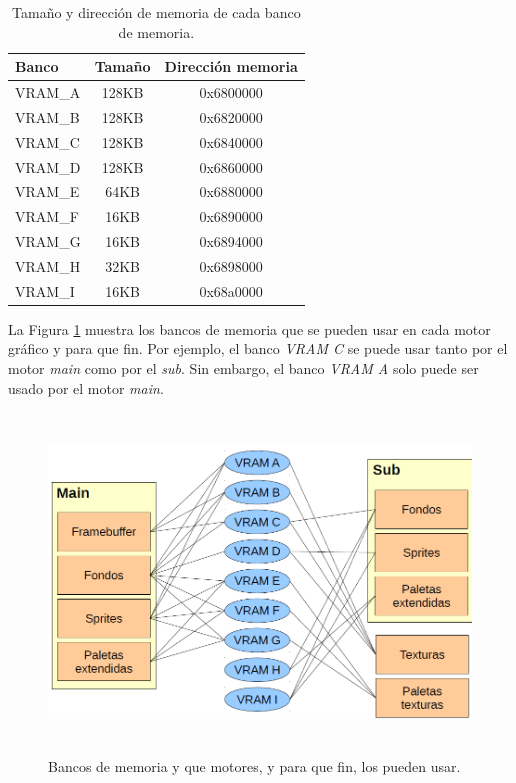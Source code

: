 \begin{table}[t]
\centering
\caption{Tamaño y dirección de memoria de cada banco de memoria.}
\begin{tabular}{|l |c | c|}
\hline
Banco & Tamaño &  Dirección memoria  \\
\hline
\hline
VRAM\_A & 128KB & 0x6800000 \\
\hline
VRAM\_B & 128KB  &	0x6820000 \\
\hline
VRAM\_C & 128KB  &	0x6840000 \\
\hline
VRAM\_D	& 128KB  &	0x6860000 \\
\hline
VRAM\_E	& 64KB  &	0x6880000\\
\hline
VRAM\_F	& 16KB  &	0x6890000 \\
\hline
VRAM\_G	& 16KB  &	0x6894000\\
\hline
VRAM\_H	& 32KB & 	0x6898000 \\
\hline
VRAM\_I	& 16KB  &	0x68a0000\\
\hline
\end{tabular}
\label{tab_c5_NivelesDeEjecución}
\end{table}

La Figura \ref{fig_c5_vram} muestra los bancos de memoria que se pueden usar en cada motor gráfico y para que fin. Por ejemplo, el banco \textit{VRAM C} se puede usar tanto por el motor \textit{main} como por el \textit{sub}. Sin embargo, el banco \textit{VRAM A} solo puede ser usado por el motor \textit{main}.

\begin{figure}[t]
	\centering
	\includegraphics[height=9cm]{Figuras/C5/c5_vram.png}
	\caption{Bancos de memoria y que motores, y para que fin, los pueden usar.}
	\label{fig_c5_vram}
\end{figure}
